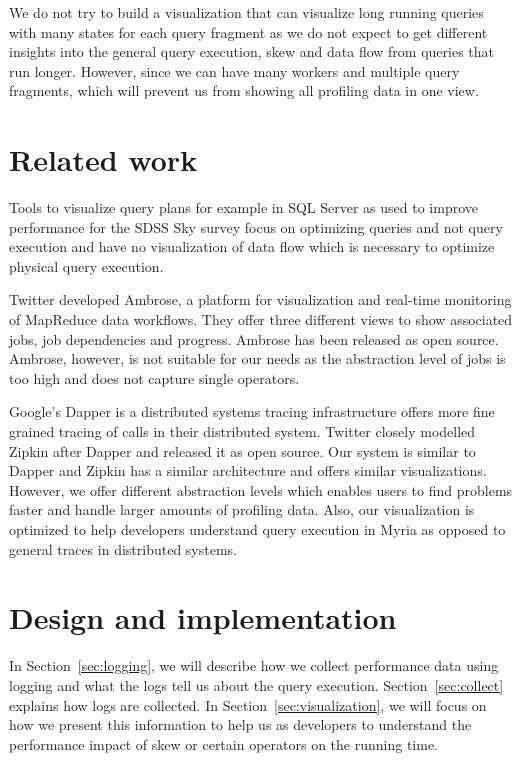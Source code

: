 \documentclass[11pt]{scrartcl}
\begin{document}
We do not try to build a visualization that can visualize long running queries with many states for each query fragment as we do not expect to get different insights into the general query execution, skew and data flow from queries that run longer. However, since we can have many workers and multiple query fragments, which will prevent us from showing all profiling data in one view.



\section{Related work}

Tools to visualize query plans for example in SQL Server as used to improve performance for the SDSS Sky survey\cite{szalay2002sdss} focus on optimizing queries and not query execution and have no visualization of data flow which is necessary to optimize physical query execution.

Twitter developed Ambrose\cite{ambrose}, a platform for visualization and real-time monitoring of MapReduce data workflows. They offer three different views to show associated jobs, job dependencies and progress. Ambrose has been released as open source. Ambrose, however, is not suitable for our needs as the abstraction level of jobs is too high and does not capture single operators.

Google's Dapper\cite{sigelman2010dapper} is a distributed systems tracing infrastructure offers more fine grained tracing of calls in their distributed system. Twitter closely modelled Zipkin\cite{zipkin} after Dapper and released it as open source. Our system is similar to Dapper and Zipkin has a similar architecture and offers similar visualizations. However, we offer different abstraction levels which enables users to find problems faster and handle larger amounts of profiling data. Also, our visualization is optimized to help developers understand query execution in Myria as opposed to general traces in distributed systems.


\section{Design and implementation}

In Section~\ref{sec:logging}, we will describe how we collect performance data using logging and what the logs tell us about the query execution. Section~\ref{sec:collect} explains how logs are collected. In Section~\ref{sec:visualization}, we will focus on how we present this information to help us as developers to understand the performance impact of skew or certain operators on the running time.
\end{document}
